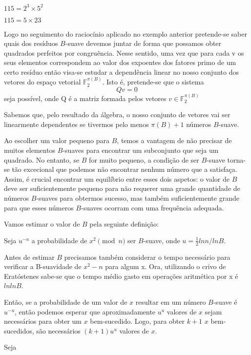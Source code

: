 $115=2^3\times5^2$

$115=5\times23$

Logo no seguimento do raciocínio aplicado no exemplo anterior pretende-se saber quais dos resíduos \(B\)-suave devemos juntar de forma que possamos obter quadrados perfeitos por congruência. Nesse sentido, uma vez que para cada v os seus elementos correspondem ao valor dos expoentes dos fatores primo de um certo resíduo então visa-se estudar a dependência linear no nosso conjunto dos vetores 
 do espaço vetorial $\mathbb{F}_2^{\pi(B)}$. Isto é, pretende-se que o sistema $$Qv=0$$
 seja possível, onde Q é a matriz formada pelos vetores $v \in \mathbb{F}_2^{\pi(B)} $

Sabemos que, pelo resultado da álgebra, o nosso conjunto de vetores vai ser linearmente dependentes se tivermos pelo menos $\pi(B)+1$ números \(B\)-suave.

Ao escolher um valor pequeno para \(B\), temos a vantagem de não precisar de muitos elementos \(B\)-suaves para encontrar um subconjunto que seja um quadrado. No entanto, se \(B\) for muito pequeno, a condição de ser \(B\)-suave torna-se tão excecional que podemos não encontrar nenhum número que a satisfaça. Assim, é crucial encontrar um equilíbrio entre esses dois aspetos: o valor de \(B\) deve ser suficientemente pequeno para não requerer uma grande quantidade de números 
\(B\)-suaves para obtermos sucesso, mas também suficientemente grande para que esses números \(B\)-suaves ocorram com uma frequência adequada.

Vamos estimar o valor de \(B\) pela seguinte definição:

\begin{definicao}Seja $u^{-u}$ a probabilidade de $x^2 \pmod n$ ser \(B\)-suave, onde $u=\frac{1}{2}lnn/lnB$.
\end{definicao}

Antes de estimar \(B\) precisamos também considerar o tempo necessário para verificar a B-suavidade de $x^2-n$ para algum x. Ora, utilizando o crivo de Eratóstenes sabe-se que o tempo médio gasto em operações aritmética por x é $lnlnB$.

Então, se a probabilidade de um valor de \( x \) resultar em um número \( B \)-suave é \( u^{-u} \), então podemos esperar que aproximadamente \( u^u \) valores de \( x \) sejam necessários para obter um \( x \) bem-sucedido. Logo, para obter \( k+1 \) \( x \) bem-sucedidos, são necessários \( (k+1)u^u \) valores de \( x \).


Seja 

